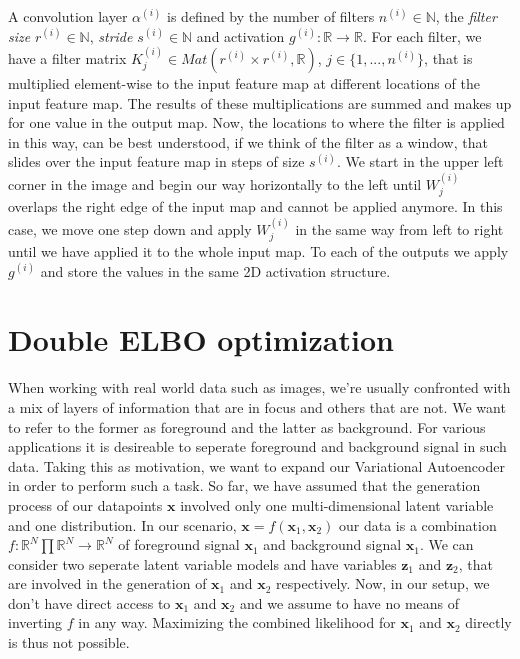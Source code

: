 \documentclass[12pt]{report}
\theoremstyle{definition}
\begin{document}
A convolution layer $\alpha^{(i)}$ is defined by the number of filters $n^{(i)} \in \mathbb{N}$, the \emph{filter size} $r^{(i)}\in \mathbb{N}$, \emph{stride} $s^{(i)} \in \mathbb{N}$ and activation $g^{(i)}: \mathbb{R} \rightarrow \mathbb{R}$. For each filter, we have a filter matrix $K^{(i)}_j \in Mat(r^{(i)} \times r^{(i)}, \mathbb{R})$, $j \in \{ 1, ..., n^{(i)}\}$,  that is multiplied element-wise to the input feature map at different locations of the input feature map. The results of these multiplications are summed and makes up for one value in the output map. Now, the locations to where the filter is applied in this way, can be best understood, if we think of the filter as a window, that slides over the input feature map in steps of size $s^{(i)}$. We start in the upper left corner in the image and begin our way horizontally to the left until $W^{(i)}_j$ overlaps the right edge of the input map and cannot be applied anymore. In this case, we move one step down and apply $W^{(i)}_j$ in the same way from left to right until we have applied it to the whole input map. To each of the outputs we apply $g^{(i)}$ and store the values in the same 2D activation structure.

\section{Double ELBO optimization}
When working with real world data such as images, we're usually confronted with a mix of layers of information that are in focus and others that are not. We want to refer to the former as foreground and the latter as background. For various applications it is desireable to seperate foreground and background signal in such data. Taking this as motivation, we want to expand our Variational Autoencoder in order to perform such a task.
So far, we have assumed that the generation process of our datapoints $\mathbf{x}$ involved only one multi-dimensional latent variable and one distribution. In our scenario, $\mathbf{x} = f(\mathbf{x}_1, \mathbf{x}_2)$ our data is a combination $f: \mathbb{R}^{N} \prod \mathbb{R}^N \rightarrow \mathbb{R}^N$ of foreground signal $\mathbf{x}_1$ and background signal $\mathbf{x}_1$.
We can consider two seperate latent variable models and have variables $\mathbf{z}_1$ and $\mathbf{z}_2$, that are involved in the generation of $\mathbf{x}_1$ and $\mathbf{x}_2$ respectively. Now, in our setup, we don't have direct access to $\mathbf{x}_1$ and $\mathbf{x}_2$ and we assume to have no means of inverting $f$ in any way. Maximizing the combined likelihood for $\mathbf{x}_1$ and $\mathbf{x}_2$ directly is thus not possible.
\end{document}
